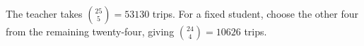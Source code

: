 The teacher takes $\binom{25}{5}=\boxed{53130}$ trips. For a fixed student, choose the other four from the remaining twenty-four, giving $\binom{24}{4}=\boxed{10626}$ trips.

